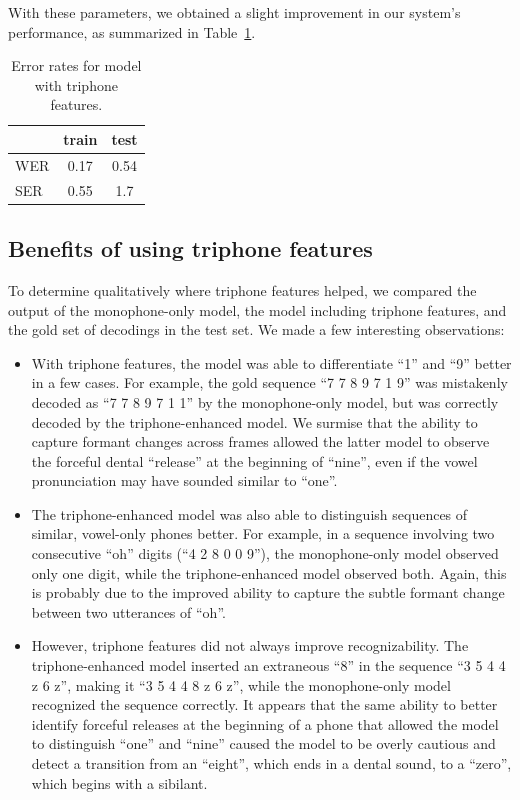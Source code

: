 \documentclass[twocolumn, 11pt]{article}
\begin{document}
With these parameters, we obtained a slight improvement in our system's
performance, as summarized in Table~\ref{tab:wer-triphone}.

\begin{table}[h]\centering
  \begin{tabular}{lcc}
    \toprule
    & train & test \\
    \midrule
    WER & 0.17 & 0.54 \\
    SER & 0.55 & 1.7 \\
    \bottomrule
  \end{tabular}
  \caption{Error rates for model with triphone features.}\label{tab:wer-triphone}
\end{table}

\subsection{Benefits of using triphone features}
To determine qualitatively where triphone features helped, we compared the output
of the monophone-only model, the model including triphone features, and the gold
set of decodings in the test set. We made a few interesting observations:

\begin{itemize}
  \item With triphone features, the model was able to differentiate ``1'' and
  ``9'' better in a few cases. For example, the gold sequence ``7 7 8 9 7 1 9''
  was mistakenly decoded as ``7 7 8 9 7 1 1'' by the monophone-only model, but
  was correctly decoded by the triphone-enhanced model. We surmise that the
  ability to capture formant changes across frames allowed the latter model to
  observe the forceful dental ``release'' at the beginning of ``nine'', even if
  the vowel pronunciation may have sounded similar to ``one''.
  \item The triphone-enhanced model was also able to distinguish sequences of
  similar, vowel-only phones better. For example, in a sequence involving two
  consecutive ``oh'' digits (``4 2 8 0 0 9''), the monophone-only model observed
  only one digit, while the triphone-enhanced model observed both. Again, this
  is probably due to the improved ability to capture the subtle formant change
  between two utterances of ``oh''.
  \item However, triphone features did not always improve recognizability. The
  triphone-enhanced model inserted an extraneous ``8'' in the sequence ``3 5 4 4
  z 6 z'', making it ``3 5 4 4 8 z 6 z'', while the monophone-only model
  recognized the sequence correctly. It appears that the same ability to better
  identify forceful releases at the beginning of a phone that allowed the model
  to distinguish ``one'' and ``nine'' caused the model to be overly cautious and
  detect a transition from an ``eight'', which ends in a dental sound, to a
  ``zero'', which begins with a sibilant.
\end{itemize}
\end{document}
